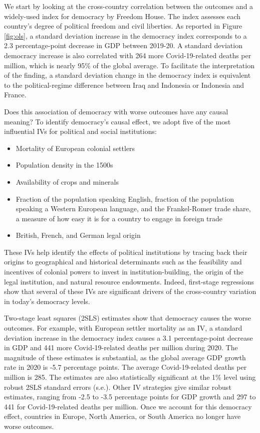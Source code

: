 We start by looking at the cross-country correlation between the outcomes and a widely-used index for democracy by Freedom House. The index assesses each country's degree of political freedom and civil liberties. As reported in Figure \ref{fig:ols}, a standard deviation increase in the democracy index corresponds to a 2.3 percentage-point decrease in GDP between 2019-20. A standard deviation democracy increase is also correlated with 264 more Covid-19-related deaths per million, which is nearly 95\% of the global average. To facilitate the interpretation of the finding, a standard deviation change in the democracy index is equivalent to the political-regime difference between Iraq and Indonesia or Indonesia and France. %

Does this association of democracy with worse outcomes have any causal meaning? To identify democracy's causal effect, we adopt five of the most influential IVs for political and social institutions: 
\begin{itemize}
    \item Mortality of European colonial settlers \citep{acemogluColonialOriginsComparative2001}
    \item Population density in the 1500s \citep{acemogluReversalFortuneGeography2002}
    \item Availability of crops and minerals \citep{easterlyTropicsGermsCrops2003}
    \item Fraction of the population speaking English, fraction of the population speaking a Western European language, and the Frankel-Romer trade share, a measure of how easy it is for a country to engage in foreign trade \citep{hallWhyCountriesProduce1999}
    \item British, French, and German legal origin \citep{portaLawFinance1998}
\end{itemize}
These IVs help identify the effects of political institutions by tracing back their origins to geographical and historical determinants such as the feasibility and incentives of colonial powers to invest in institution-building, the origin of the legal institution, and natural resource endowments. Indeed, first-stage regressions show that several of these IVs are significant drivers of the cross-country variation in today's democracy levels. 

Two-stage least squares (2SLS) estimates show that democracy causes the worse outcomes. For example, with European settler mortality as an IV, a standard deviation increase in the democracy index causes a 3.1 percentage-point decrease in GDP and 441 more Covid-19-related deaths per million during 2020. The magnitude of these estimates is substantial, as the global average GDP growth rate in 2020 is -5.7 percentage points. The average Covid-19-related deaths per million is 285. The estimates are also statistically significant at the 1\% level using robust 2SLS standard errors (s.e.). Other IV strategies give similar robust estimates, ranging from -2.5 to -3.5 percentage points for GDP growth and 297 to 441 for Covid-19-related deaths per million. 
Once we account for this democracy effect, countries in Europe, North America, or South America no longer have worse outcomes. 

